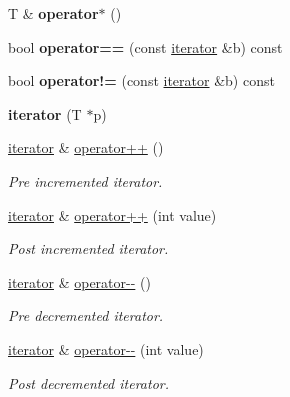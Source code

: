 \begin{DoxyCompactItemize}
\mbox{\label{classVector_1_1iterator_adafb5dc1c8d8d0cf162e1176757fe5ac}} 
T \& {\bfseries operator$\ast$} ()
\item 
\mbox{\label{classVector_1_1iterator_ad6f309683b2a0765387e048530e1c1bc}} 
bool {\bfseries operator==} (const \hyperlink{classVector_1_1iterator}{iterator} \&b) const
\item 
\mbox{\label{classVector_1_1iterator_acb5d4950c8847cf89a63551d68ec869b}} 
bool {\bfseries operator!=} (const \hyperlink{classVector_1_1iterator}{iterator} \&b) const
\item 
\mbox{\label{classVector_1_1iterator_a30d2ea1f84460afa51f388b40b3532f1}} 
{\bfseries iterator} (T $\ast$p)
\item 
\hyperlink{classVector_1_1iterator}{iterator} \& \hyperlink{classVector_1_1iterator_a2e6098221d0a8b40c753819138a2d710}{operator++} ()
\begin{DoxyCompactList}\small\item\em Pre incremented iterator. \end{DoxyCompactList}\item 
\hyperlink{classVector_1_1iterator}{iterator} \& \hyperlink{classVector_1_1iterator_a8e9cf2d45f325d1ed8979706ca97f498}{operator++} (int value)
\begin{DoxyCompactList}\small\item\em Post incremented iterator. \end{DoxyCompactList}\item 
\hyperlink{classVector_1_1iterator}{iterator} \& \hyperlink{classVector_1_1iterator_a00fc1009bd761df83fd96b314d07d60d}{operator-\/-\/} ()
\begin{DoxyCompactList}\small\item\em Pre decremented iterator. \end{DoxyCompactList}\item 
\hyperlink{classVector_1_1iterator}{iterator} \& \hyperlink{classVector_1_1iterator_ab9fe4e94caea68d0460baebb6c224bb6}{operator-\/-\/} (int value)
\begin{DoxyCompactList}\small\item\em Post decremented iterator. \end{DoxyCompactList}\item 
\mbox{\label{classVector_1_1iterator_adafb5dc1c8d8d0cf162e1176757fe5ac}} 

\end{DoxyCompactItemize}
